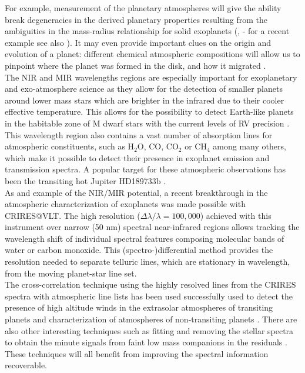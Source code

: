 \documentclass[pdftex,12pt,a4paper]{article}
\begin{document}
For example, measurement of the planetary atmospheres will give the ability break degeneracies in the derived planetary properties resulting from the ambiguities in the mass-radius relationship for solid exoplanets (\citealp[e.g.] []{Valencia2006, Fortney2007}, - for a recent example see also \citealp{Miller-Ricci2012}). It may even provide important clues on the origin and evolution of a planet: different chemical atmospheric compositions will allow us to pinpoint where the planet was formed in the disk, and how it migrated \citep{Figueira2009, Mordasini2012}.\\

The NIR and MIR wavelengths regions are especially important for exoplanetary and exo-atmosphere science as they allow for the detection of smaller planets around lower mass stars which are brighter in the infrared due to their cooler effective temperature. This allows for the possibility to detect Earth-like planets in the habitable zone of M dwarf stars with the current levels of {RV} precision \citep[e.g.][]{Reiners2010}. This wavelength region also contains a vast number of absorption lines for atmospheric constituents, such as H$_2$O, CO, CO$_2$ or CH$_4$ among many others, which make it possible to detect their presence in exoplanet emission and transmission spectra. A popular target for these atmospheric observations has been the transiting hot Jupiter HD189733b \citep[e.g.][]{Swain2008, Desert2009, Kok2013}. \\

As and example of the NIR/MIR potential, a recent breakthrough in the atmospheric characterization of exoplanets was made possible with CRIRES@VLT. The high resolution ($\Delta\lambda / \lambda = 100,000$) achieved with this instrument over narrow (50 nm) spectral near-infrared regions allows tracking the wavelength shift of individual spectral features composing molecular bands of water or carbon monoxide. This (spectro-)differential method provides the resolution needed to separate telluric lines, which are stationary in wavelength, from the moving planet-star line set.\\

The cross-correlation technique using the highly resolved lines from the CRIRES spectra with atmospheric line lists has been used successfully used to detect the presence of high altitude winds in the extrasolar atmospheres of transiting planets \citep[e.g.][]{Snellen2010} and characterization of atmospheres of non-transiting planets \citep[e.g.][]{Brogi2012}. There are also other interesting techniques such as fitting and removing the stellar spectra to obtain the minute signals from faint low mass companions in the residuals \citep{kolbl2015}. These techniques will all benefit from improving the spectral information recoverable.\\
\end{document}
